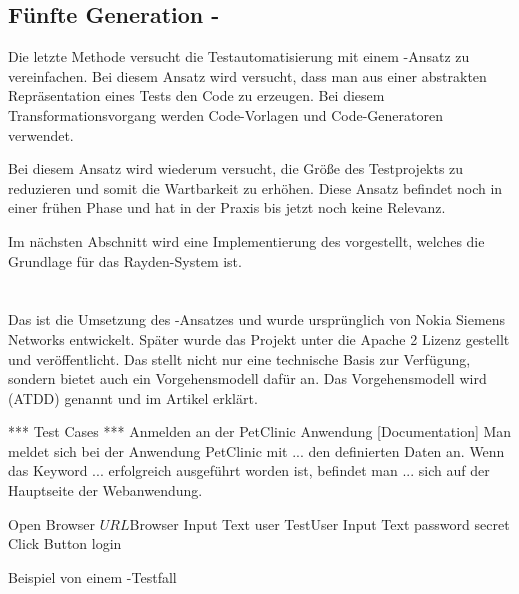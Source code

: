\subsection{Fünfte Generation - }

Die letzte Methode versucht die Testautomatisierung mit einem -Ansatz zu vereinfachen. Bei diesem Ansatz wird versucht, dass man aus einer abstrakten Repräsentation eines Tests den Code zu erzeugen. Bei diesem Transformationsvorgang werden Code-Vorlagen und Code-Generatoren verwendet.

\SuperPar
Bei diesem Ansatz wird wiederum versucht, die Größe des Testprojekts zu reduzieren und somit die Wartbarkeit zu erhöhen. Diese Ansatz befindet noch in einer frühen Phase und hat in der Praxis bis jetzt noch keine Relevanz. 

\SuperPar
Im nächsten Abschnitt wird eine Implementierung des  vorgestellt, welches die Grundlage für das Rayden-System ist.

\section{}

Das  \cite{Robot} ist die Umsetzung des -Ansatzes und wurde ursprünglich von Nokia Siemens Networks entwickelt. Später wurde das Projekt unter die Apache 2 Lizenz gestellt und veröffentlicht. Das  stellt nicht nur eine technische Basis zur Verfügung, sondern bietet auch ein Vorgehensmodell dafür an. Das Vorgehensmodell wird  (ATDD) genannt und im Artikel \cite{Lar10} erklärt.

\begin{program}
\begin{JavaCode}
*** Test Cases ***
Anmelden an der PetClinic Anwendung
	[Documentation]	Man meldet sich bei der Anwendung PetClinic mit 
	...             den definierten Daten an. Wenn das Keyword 
	...             erfolgreich ausgeführt worden ist, befindet man 
	...             sich auf der Hauptseite der Webanwendung.
	
	Open Browser	${URL}		${Browser}
	Input Text    user			TestUser
	Input Text		password	secret
	Click Button	login

\end{JavaCode}
\caption{Beispiel von einem -Testfall}
\label{prog:robotTestCase}
\end{program}


